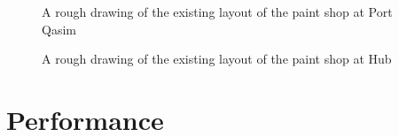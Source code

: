 \documentclass[a4paper,10pt]{article}
\begin{document}
\begin{figure}[h]
\centering {}
\caption{A rough drawing of the existing layout of the paint shop at Port Qasim}
\label{fig:Layout} 
\end{figure}

\begin{figure}[h]
\centering {}
\caption{A rough drawing of the existing layout of the paint shop at Hub}
\label{fig:Layout2} 
\end{figure}


\section{Performance}
\end{document}

